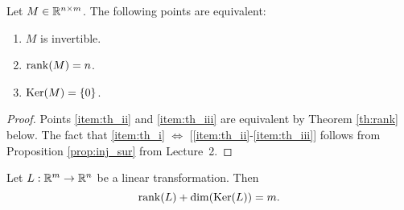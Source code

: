 \documentclass[11pt,nocut]{article}
\begin{document}
\begin{theorem}
	Let $M \in \mathbb{R}^{n \times m}$. The following points are equivalent:
	\begin{enumerate}[label=(\roman*)]
		\item \label{item:th_i} $M$ is invertible.
		\item \label{item:th_ii} ${{\rm rank}}(M) = n$.
		\item \label{item:th_iii} ${{\rm Ker}}(M) = \{0\}$.
	\end{enumerate}
\end{theorem}
\begin{proof}
	Points \ref{item:th_ii} and \ref{item:th_iii} are equivalent by Theorem \ref{th:rank} below. The fact that \ref{item:th_i} $\Leftrightarrow$ [\ref{item:th_ii}-\ref{item:th_iii}] follows from Proposition \ref{prop:inj_sur} from Lecture~2.
\end{proof}

\begin{theorem}\label{th:rank}
	Let $L: \mathbb{R}^m \to \mathbb{R}^n$ be a linear transformation. Then
	$$
	{{\rm rank}}(L) + {{\rm dim}}({{\rm Ker}}(L)) = m.
	$$
\end{theorem}
\end{document}
